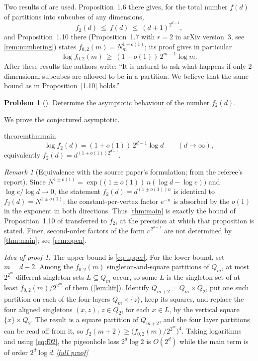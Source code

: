 \documentclass[11pt,a4paper]{article}
\theoremstyle{plain}
\theoremstyle{definition}
\newtheorem{problem}[theorem]{Problem}
\theoremstyle{remark}
\newtheorem{remark}[theorem]{Remark}
\newtheorem*{proofidea}{Idea of proof}
\newcommand{\fullproofref}[1]{\,\hyperref[#1]{\textit{[full proof]}}}
\begin{document}
Two results of \cite{ABP} are used. Proposition~1.6 there gives, for the total number $f(d)$ of partitions into subcubes of any dimensions,
\begin{equation}\label{eq:upper}
 f_2(d)\ \le\ f(d)\ \le\ (d+1)^{2^{d-1}},
\end{equation}
and Proposition~1.10 there (Proposition~1.7 with $r=2$ in arXiv version~3, see \cref{rem:numbering}) states $f_{0,2}(m)=N_m^{1+o(1)}$; its proof gives in particular
\begin{equation}\label{eq:f02}
 \log f_{0,2}(m)\ \ge\ (1-o(1))\,2^{m-1}\log m .
\end{equation}
After these results the authors write: ``It is natural to ask what happens if only $2$-dimensional subcubes are allowed to be in a partition. We believe that the same bound as in Proposition~[1.10] holds.''

\begin{problem}[{\cite[Problem 1.11 in arXiv v1/v2; Problem 1.9 in the published version]{ABP}}]\label{prob}
Determine the asymptotic behaviour of the number $f_2(d)$.
\end{problem}

We prove the conjectured asymptotic.

\begin{restatable}{theorem}{thmmain}\label{thm:main}
\[
 \log f_2(d)=(1+o(1))\,2^{d-1}\log d\qquad(d\to\infty),
\]
equivalently $f_2(d)=d^{(1+o(1))2^{d-1}}$.
\end{restatable}

\begin{remark}[Equivalence with the source paper's formulation; from the referee's report]\label{rem:equiv}
Since $N^{1\pm o(1)}=\exp\bigl((1\pm o(1))\,n(\log d-\log e)\bigr)$ and $\log e/\log d\to0$, the statement $f_2(d)=d^{(1\pm o(1))n}$ is identical to $f_2(d)=N^{1\pm o(1)}$: the constant-per-vertex factor $e^{-n}$ is absorbed by the $o(1)$ in the exponent in both directions. Thus \cref{thm:main} is exactly the bound of Proposition~1.10 of \cite{ABP} transferred to $f_2$, at the precision at which that proposition is stated. Finer, second-order factors of the form $c^{\,2^{d-1}}$ are not determined by \cref{thm:main}; see \cref{rem:open}.
\end{remark}

\begin{proofidea}
The upper bound is \eqref{eq:upper}. For the lower bound, set $m=d-2$. Among the $f_{0,2}(m)$ singleton-and-square partitions of $Q_m$, at most $2^{2^m}$ different singleton sets $L\subseteq Q_m$ occur, so some $L$ is the singleton set of at least $f_{0,2}(m)/2^{2^m}$ of them (\cref{lem:lift}). Identify $Q_{m+2}=Q_m\times Q_2$, put one such partition on each of the four layers $Q_m\times\{z\}$, keep its squares, and replace the four aligned singletons $(x,z)$, $z\in Q_2$, for each $x\in L$, by the vertical square $\{x\}\times Q_2$. The result is a square partition of $Q_{m+2}$, and the four layer partitions can be read off from it, so $f_2(m+2)\ge\bigl(f_{0,2}(m)/2^{2^m}\bigr)^4$. Taking logarithms and using \eqref{eq:f02}, the pigeonhole loss $2^{d}\log2$ is $O(2^d)$ while the main term is of order $2^d\log d$.\fullproofref{pf:main}
\end{proofidea}
\end{document}
